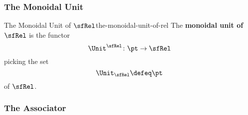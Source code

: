 \subsubsection{The Monoidal Unit}\label{subsubsection-the-closed-symmetric-monoidal-category-of-relations-the-monoidal-unit}
\begin{definition}{The Monoidal Unit of $\sfRel$}{the-monoidal-unit-of-rel}%
    The \textbf{monoidal unit of $\sfRel$} is the functor
    \[
        \Unit^{\sfRel}%
        \colon%
        \pt%
        \to%
        \sfRel%
    \]%
    picking the set
    \[
        \Unit_{\sfRel}%
        \defeq%
        \pt%
    \]%
    of $\sfRel$.
\end{definition}
\subsubsection{The Associator}\label{subsubsection-the-closed-symmetric-monoidal-category-of-relations-the-associator}
